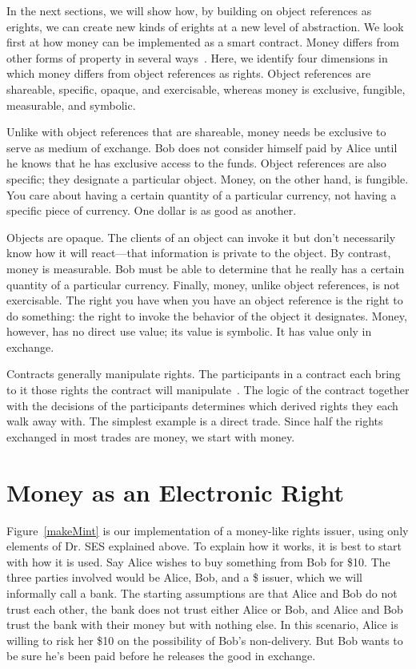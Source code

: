 \documentclass{llncs}
\begin{document}
In the next sections, we will show how, by building on object references as erights, we can create new kinds of erights at a new level of abstraction. We look first at how money can be implemented as a smart contract. Money differs from other forms of property in several ways~\cite{fox_property_2008}.  Here, we identify four dimensions in which money differs from object references as rights. Object references are shareable, specific, opaque, and exercisable, whereas money is exclusive, fungible, measurable, and symbolic.

Unlike with object references that are shareable, money needs be exclusive to serve as medium of exchange. Bob does not consider himself paid by Alice until he knows that he has exclusive access to the funds. Object references are also specific; they designate a particular object. Money, on the other hand, is fungible. You care about having a certain quantity of a particular currency, not having a specific piece of currency. One dollar is as good as another. 

Objects are opaque. The clients of an object can invoke it but don't necessarily know how it will react---that information is private to the object. By contrast, money is measurable. Bob must be able to determine that he really has a certain quantity of a particular currency. Finally, money, unlike object references, is not exercisable. The right you have when you have an object reference is the right to do something: the right to invoke the behavior of the object it designates. Money, however, has no direct use value; its value is symbolic. It has value only in exchange.


Contracts generally manipulate rights. The participants in a contract each bring to it those rights the contract will manipulate~\cite{barnett_consent_1986}. The logic of the contract together with the decisions of the participants determines which derived rights they each walk away with. The simplest example is a direct trade. Since half the rights exchanged in most trades are money, we start with money.


\section{Money as an Electronic Right}
\label{money}

Figure~\ref{makeMint}  is our implementation of a money-like rights issuer, using only elements of Dr. SES explained above. To explain how it works, it is best to start with how it is used. Say Alice wishes to buy something from Bob for \$10. The three parties involved would be Alice, Bob, and a \$ issuer, which we will informally call a bank. The starting assumptions are that Alice and Bob do not trust each other, the bank does not trust either Alice or Bob, and Alice and Bob trust the bank with their money but with nothing else. In this scenario, Alice is willing to risk her \$10 on the possibility of Bob's non-delivery. But Bob wants to be sure he's been paid before he releases the good in exchange.
\end{document}
